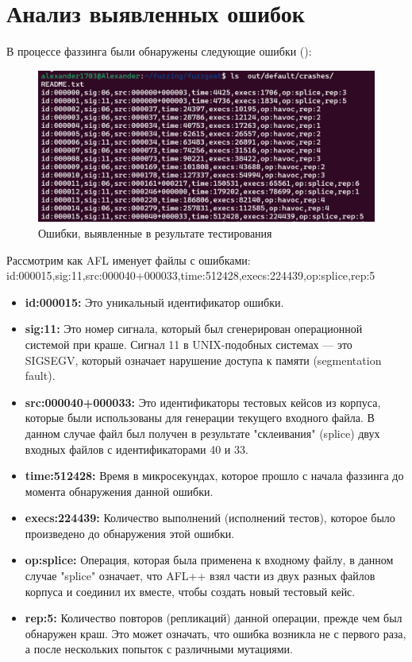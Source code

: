 \section{Анализ выявленных ошибок} \label{ch4:sec2}
В процессе фаззинга были обнаружены следующие ошибки ():

\begin{figure}[ht] 
	\center
	\includegraphics [scale=1] {my_folder/images/errors}
	\caption{Ошибки, выявленные в результате тестирования} 
	\label{fig:errors-ch4}  
\end{figure}

Рассмотрим как AFL именует файлы с ошибками:
id:000015,sig:11,src:000040+000033,time:512428,execs:224439,op:splice,rep:5

\begin{itemize}
	\item \textbf{id:000015:} Это уникальный идентификатор ошибки.
	\item \textbf{sig:11:} Это номер сигнала, который был сгенерирован операционной системой при краше. Сигнал 11 в UNIX-подобных системах — это SIGSEGV, который означает нарушение доступа к памяти (segmentation fault).
	\item \textbf{src:000040+000033:} Это идентификаторы тестовых кейсов из корпуса, которые были использованы для генерации текущего входного файла. В данном случае файл был получен в результате "склеивания" (splice) двух входных файлов с идентификаторами 40 и 33.
	\item \textbf{time:512428:} Время в микросекундах, которое прошло с начала фаззинга до момента обнаружения данной ошибки.
	\item \textbf{execs:224439:} Количество выполнений (исполнений тестов), которое было произведено до обнаружения этой ошибки.
	\item \textbf{op:splice:} Операция, которая была применена к входному файлу, в данном случае "splice" означает, что AFL++ взял части из двух разных файлов корпуса и соединил их вместе, чтобы создать новый тестовый кейс.
	\item \textbf{rep:5:} Количество повторов (репликаций) данной операции, прежде чем был обнаружен краш. Это может означать, что ошибка возникла не с первого раза, а после нескольких попыток с различными мутациями.
\end{itemize}

